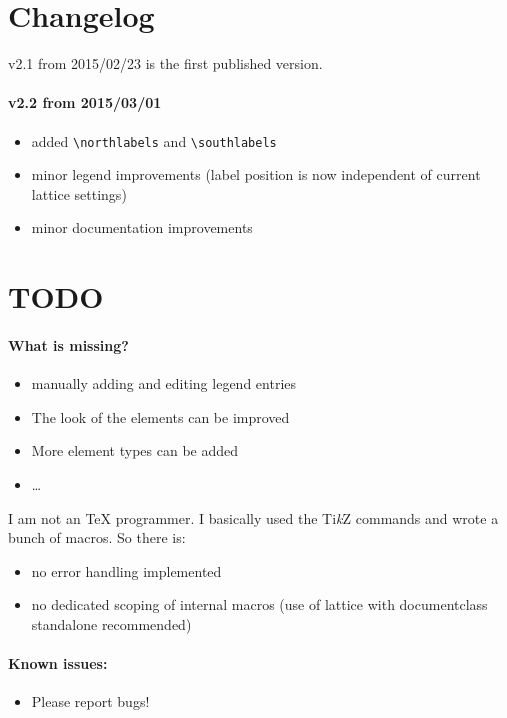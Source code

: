 \documentclass[a4paper]{scrartcl}
\newcommand{\tikzlabel}{Ti\textit{k}Z}
\begin{document}
\section{Changelog}
\label{sec:changelog}
v2.1 from 2015/02/23 is the first published version.

\paragraph{v2.2 from 2015/03/01}
\begin{itemize}
\item added \lstinline+\northlabels+ and \lstinline+\southlabels+
\item minor legend improvements (label position is now independent of current lattice settings)
\item minor documentation improvements
\end{itemize}


\section{TODO}
\label{sec:todo}

\paragraph{What is missing?}
\begin{itemize}
\item manually adding and editing legend entries
\item The look of the elements can be improved
\item More element types can be added
\item \ldots{}
\end{itemize}

I am not an \TeX{} programmer. I basically used the \tikzlabel{} commands and wrote a
bunch of macros. So there is:
\begin{itemize}
\item no error handling implemented
\item no dedicated scoping of internal macros (use of lattice with documentclass standalone recommended)
\end{itemize}

\paragraph{Known issues:}
\begin{itemize}
\item Please report bugs!
\end{itemize}
\end{document}
